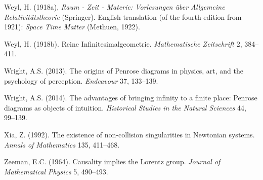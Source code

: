 \documentclass[12pt]{article}
\begin{document}
\begin{small}
\begin{thebibliography}{99}
   \item[] Weyl, H. (1918a), \emph{Raum - Zeit - Materie: Vorlesungen \"{u}ber Allgemeine Relativit\"{a}tstheorie}
  (Springer). English translation (of the fourth edition from 1921): \emph{Space Time Matter} (Methuen, 1922). 
    \item[] Weyl, H. (1918b). Reine Infinitesimalgeometrie. \emph{Mathematische Zeitschrift} 2, 384--411.  
     \item[]  Wright, A.S. (2013). The origins of Penrose diagrams in physics, art, and the psychology of perception.
   \emph{Endeavour} 37, 133--139.
  \item[]  Wright, A.S. (2014). The advantages of bringing infinity to a finite place: Penrose diagrams as objects of intuition.
  \emph{ Historical Studies in the Natural Sciences} 44, 99--139.
  \item[] Xia, Z.  (1992). The existence of non-collision singularities
in Newtonian systems. \emph{Annals of Mathematics} 135, 411--468. 
    \item[] Zeeman, E.C. (1964). Causality implies the Lorentz group. \emph{Journal of Mathematical Physics} 5, 490--493.
\end{thebibliography}
\end{small}
\end{document}

